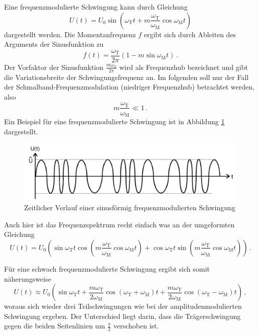 Eine frequenzmodulierte Schwingung kann durch Gleichung
\begin{equation*}
    U(t) = U_\text{0} \sin{\left( \omega_\text{T} t + m \frac{\omega_\text{T}}{\omega_\text{M}} \cos{\omega_\text{M} t} \right)}
\end{equation*}
dargestellt werden.
Die Momentanfrequenz $f$ ergibt sich durch Ableiten des Arguments der Sinusfunktion zu
\begin{equation*}
    f(t) = \frac{\omega_\text{T}}{2 \pi} ( 1 - m \sin{\omega_\text{M} t}) \,.
\end{equation*}
Der Vorfaktor der Sinusfunktion $\frac{m \omega_\text{T}}{2 \pi}$ wird als Frequenzhub bezeichnet und gibt die Variationsbreite der Schwingungsfrequenz an.
Im folgenden soll nur der Fall der Schmalband-Frequenzmodulation (niedriger Frequenzhub) betrachtet werden, also 
\begin{equation*}
    m \frac{\omega_\text{T}}{\omega_\text{M}} \ll 1\,.
\end{equation*}
Ein Beispiel für eine frequenzmodulierte Schwingung ist in Abbildung \ref{fm:modulation} dargestellt.

\begin{figure}[!h]
    \centering
    \includegraphics[width = 14cm]{images/fm-modulation.png}
    \caption{Zeitlicher Verlauf einer sinusförmig frequenzmodulierten Schwingung}
    \label{fm:modulation}
\end{figure}

Auch hier ist das Frequenzspektrum recht einfach was an der umgeformten Gleichung 
\begin{equation*}
    U(t) = U_\text{0} \left( \sin{\omega_\text{T} t}\cos{\left(m\frac{\omega_\text{T}}{\omega_\text{M}} \cos{\omega_\text{M} t}\right)} + \cos{\omega_\text{T} t}\sin{\left(m\frac{\omega_\text{T}}{\omega_\text{M}} \cos{\omega_\text{M} t}\right)} \right)\,.
\end{equation*}

Für eine schwach frequenzmodulierte Schwingung ergibt sich somit näherungsweise
\begin{equation*}
    U(t) \approx U_\text{0} \left( \sin{\omega_\text{T} t} + \frac{m \omega_\text{T}}{2 \omega_\text{M}} \cos{(\omega_\text{T} + \omega_\text{M}) t} + \frac{m \omega_\text{T}}{2 \omega_\text{M}} \cos{(\omega_\text{T} - \omega_\text{M}) t}\right) \,,
\end{equation*}
woraus sich wieder drei Teilschwingungen wie bei der amplitudenmodulierten Schwingung ergeben.
Der Unterschied liegt darin, dass die Trägerschwingung gegen die beiden Seitenlinien um $\frac{\pi}{2}$ verschoben ist.

